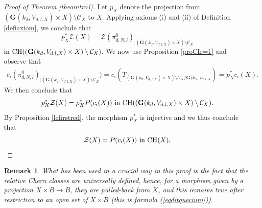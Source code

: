 \documentclass[10pt]{article}
\newtheorem{rema}[theo]{Remark}
\begin{document}
\begin{proof}[Proof of Theorem \ref{theointro1}]
 Let $p_{X}$ denote  the projection from $(\mathbf{G}(k_{d}, V_{d,l,X})\times X)\setminus \mathcal{C}_{X}$ to $X$. Applying axioms (i) and (ii) of Definition \ref{defiaxiom}, we conclude that
 $$ p_{X}^*\mathcal{Z}(X)=
 \mathcal{Z}(\pi_{d,N,l}^0)_{\mid (\mathbf{G}(k_{d}, V_{d,l,X})\times X)\setminus \mathcal{C}_{X}}$$
 in ${\rm CH}((\mathbf{G}(k_{d}, V_{d,l,X})\times X)\setminus \mathcal{C}_{X})$.
  We now use Proposition \ref{proCIr=1} and observe that
  \begin{eqnarray}\label{eqditqueciuni}  c_i( \pi_{d,N,l}^0)_{\mid (\mathbf{G}(k_{d}, V_{d,l,X})\times X)\setminus \mathcal{C}_{X}})=c_i(T_{(\mathbf{G}(k_{d}, V_{d,l,X})\times X)\setminus \mathcal{C}_{X}/\mathbf{G}(k_{d}, V_{d,l,X}})=p_X^*c_i(X).\end{eqnarray}
   We then conclude that
 \begin{eqnarray}
 p_{X}^*\mathcal{Z}(X)=p_{X}^*P(c_i(X))\,\,{\rm in}\,\,{\rm CH}((\mathbf{G}(k_{d}, V_{d,l,X})\times X)\setminus \mathcal{C}_{X}).
 \end{eqnarray}
   By  Proposition \ref{lefirstred}, the morphism
 $p_{X}^*$ is injective and we thus conclude that
 $$\mathcal{Z}(X)=P(c_i(X))\,\,{\rm in}\,\,{\rm CH}( X).$$
 \end{proof}
 \begin{rema}{\rm What  has been used in a crucial way in this proof is the fact
 that the relative Chern classes are universally defined, hence, for  a morphism given by a
 projection $X\times B\rightarrow B$, they are pulled-back from $X$, and this remains true after restriction to an open set of $X\times B$ (this  is formula (\ref{eqditqueciuni})).
 }
 \end{rema}
\end{document}

